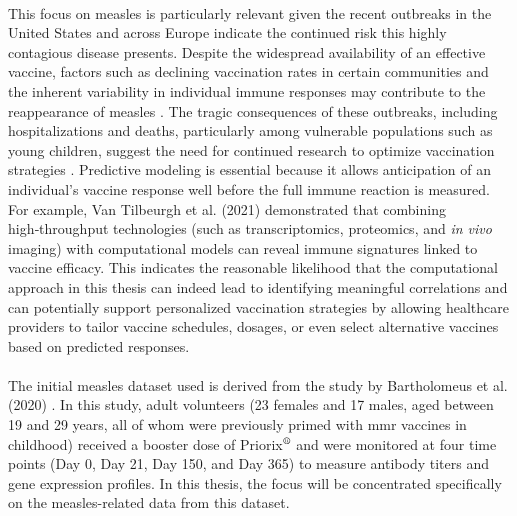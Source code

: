 \documentclass[12pt,a4paper]{report}
\begin{document}
\\
This focus on measles is particularly relevant given the recent outbreaks in the United States and across Europe indicate the continued risk this highly contagious disease presents. Despite the widespread availability of an effective vaccine, factors such as declining vaccination rates in certain communities and the inherent variability in individual immune responses may contribute to the reappearance of measles \cite{Broom2025Measles,CDC2025MeaslesData, WHOEuropeUNICEF2025Measles}. The tragic consequences of these outbreaks, including hospitalizations and deaths, particularly among vulnerable populations such as young children, suggest the need for continued research to optimize vaccination strategies \cite{moss2017measles}. Predictive modeling is essential because it allows anticipation of an individual’s vaccine response well before the full immune reaction is measured. For example, Van Tilbeurgh et al. (2021) \cite{vanTilbeurgh2021predictive} demonstrated that combining high‑throughput technologies (such as transcriptomics, proteomics, and \textit{in vivo} imaging) with computational models can reveal immune signatures linked to vaccine efficacy. This indicates the reasonable likelihood that the computational approach in this thesis can indeed lead to identifying meaningful correlations and can potentially support personalized vaccination strategies by allowing healthcare providers to tailor vaccine schedules, dosages, or even select alternative vaccines based on predicted responses.\\
\\
The initial measles dataset used is derived from the study by Bartholomeus et al. (2020) \cite{bartholomeus2020transcriptomic}.
In this study, adult volunteers (23 females and 17 males, aged between 19 and 29 years, all of whom were previously primed with \gls{mmr} vaccines in childhood) received a booster dose of Priorix$^{\mbox{\scriptsize\textregistered}}$ and were monitored at four time points (Day 0, Day 21, Day 150, and Day 365) to measure antibody titers and gene expression profiles. In this thesis, the focus will be concentrated specifically on the measles-related data from this dataset. \\
\\
\end{document}
